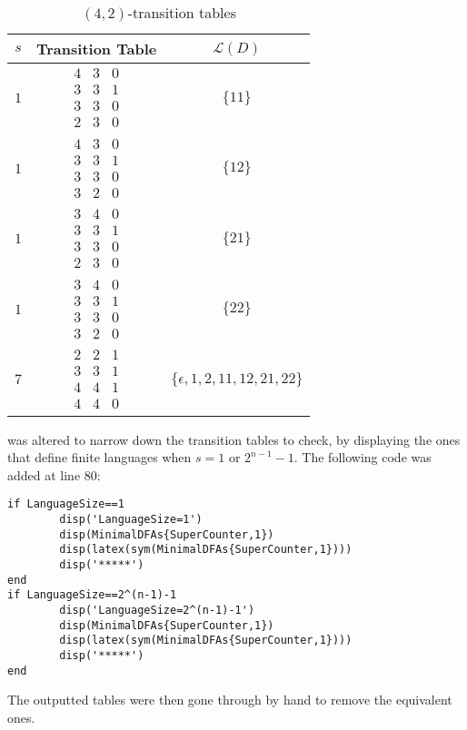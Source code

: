 \documentclass[10pt,a4paper,notitlepage]{article}
\begin{document}
\begin{table}[H]
\centering
\begin{tabular}{|c|c|c|}\hline
$s$ & Transition Table & $\mathcal{L}(D)$ \\
\hline
$1$ & $\begin{array}{ccc} 4 & 3 & 0\\ 3 & 3 & 1\\ 3 & 3 & 0\\ 2 & 3 & 0 \end{array}$ & $\lbrace 11\rbrace$\\ \hline
$1$ & $\begin{array}{ccc} 4 & 3 & 0\\ 3 & 3 & 1\\ 3 & 3 & 0\\ 3 & 2 & 0 \end{array}$ & $\lbrace 12 \rbrace$\\ \hline 
$1$ & $\begin{array}{ccc} 3 & 4 & 0\\ 3 & 3 & 1\\ 3 & 3 & 0\\ 2 & 3 & 0 \end{array}$ & $\lbrace  21\rbrace$\\ \hline
$1$ & $\begin{array}{ccc} 3 & 4 & 0\\ 3 & 3 & 1\\ 3 & 3 & 0\\ 3 & 2 & 0 \end{array}$ & $\lbrace 22 \rbrace$\\ \hline
$7$ & $\begin{array}{ccc} 2& 2 & 1\\ 3 & 3 & 1\\ 4 & 4 & 1\\ 4 & 4 & 0 \end{array}$ & $\lbrace \epsilon,1,2,11,12,21,22 \rbrace$\\ \hline
\end{tabular}
\caption{$(4,2)$-transition tables}
\end{table}
 was altered to narrow down the transition tables to check, by displaying the ones that define finite languages when $s=1$ or $2^{n-1}-1$. The following code was added at line 80:
\begin{verbatim}
if LanguageSize==1
        disp('LanguageSize=1')
        disp(MinimalDFAs{SuperCounter,1})
        disp(latex(sym(MinimalDFAs{SuperCounter,1})))
        disp('*****')
end
if LanguageSize==2^(n-1)-1
        disp('LanguageSize=2^(n-1)-1')
        disp(MinimalDFAs{SuperCounter,1})
        disp(latex(sym(MinimalDFAs{SuperCounter,1})))
        disp('*****')
end
\end{verbatim}
The outputted tables were then gone through by hand to remove the equivalent ones. 
\end{document}
